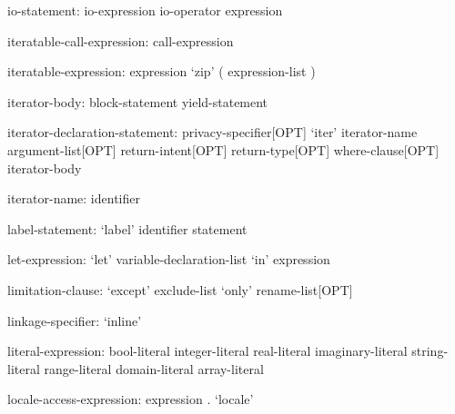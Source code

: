 \begin{syntax}
io-statement:
  io-expression io-operator expression
\end{syntax}

\begin{syntax}
iteratable-call-expression:
  call-expression
\end{syntax}

\begin{syntax}
iteratable-expression:
  expression
  `zip' ( expression-list )
\end{syntax}

\begin{syntax}
iterator-body:
  block-statement
  yield-statement
\end{syntax}

\begin{syntax}
iterator-declaration-statement:
  privacy-specifier[OPT] `iter' iterator-name argument-list[OPT] return-intent[OPT] return-type[OPT] where-clause[OPT]
  iterator-body
\end{syntax}

\begin{syntax}
iterator-name:
  identifier
\end{syntax}

\begin{syntax}
label-statement:
  `label' identifier statement
\end{syntax}

\begin{syntax}
let-expression:
  `let' variable-declaration-list `in' expression
\end{syntax}

\begin{syntax}
limitation-clause:
  `except' exclude-list
  `only' rename-list[OPT]
\end{syntax}

\begin{syntax}
linkage-specifier:
  `inline'
\end{syntax}

\begin{syntax}
literal-expression:
  bool-literal
  integer-literal
  real-literal
  imaginary-literal
  string-literal
  range-literal
  domain-literal
  array-literal
\end{syntax}

\begin{syntax}
locale-access-expression:
  expression . `locale'
\end{syntax}

